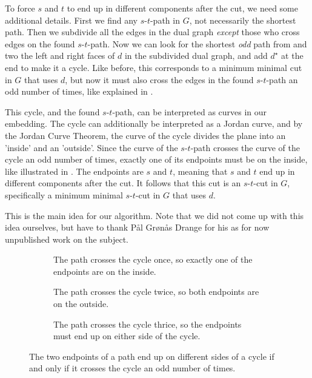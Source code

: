 To force $s$ and $t$ to end up in different components after the cut, we need some additional details. First we find any $s$-$t$-path in $G$, not necessarily the shortest path. Then we subdivide all the edges in the dual graph \emph{except} those who cross edges on the found $s$-$t$-path. Now we can look for the shortest \emph{odd} path from and two the left and right faces of $d$ in the subdivided dual graph, and add $d^\star$ at the end to make it a cycle. Like before, this corresponds to a minimum minimal cut in $G$ that uses $d$, but now it must also cross the edges in the found $s$-$t$-path an odd number of times, like explained in . 

This cycle, and the found $s$-$t$-path, can be interpreted as curves in our embedding. The cycle can additionally be interpreted as a Jordan curve, and by the Jordan Curve Theorem, the curve of the cycle divides the plane into an 'inside' and an 'outside'. Since the curve of the $s$-$t$-path crosses the curve of the cycle an odd number of times, exactly one of its endpoints must be on the inside, like illustrated in . The endpoints are $s$ and $t$, meaning that $s$ and $t$ end up in different components after the cut. It follows that this cut is an $s$-$t$-cut in $G$, specifically a minimum minimal $s$-$t$-cut in $G$ that uses $d$.

This is the main idea for our algorithm. Note that we did not come up with this idea ourselves, but have to thank Pål Grønås Drange \cite{source:pål} for his as for now unpublished work on the subject.

\begin{figure}[H]
    \centering
    \begin{subfigure}{.30\textwidth}
        \centering
        
        \caption{The path crosses the cycle once, so exactly one of the endpoints are on the inside.}
    \end{subfigure}\hfill%
    \begin{subfigure}{.30\textwidth}
        \centering
        
        \caption{The path crosses the cycle twice, so both endpoints are on the outside.}
    \end{subfigure}\hfill%
    \begin{subfigure}{.30\textwidth}
        \centering
        
        \caption{The path crosses the cycle thrice, so the endpoints must end up on either side of the cycle.}
    \end{subfigure}
    \caption{The two endpoints of a path end up on different sides of a cycle if and only if it crosses the cycle an odd number of times.}
    \label{figure:jordan-curve-cuts}
\end{figure}

